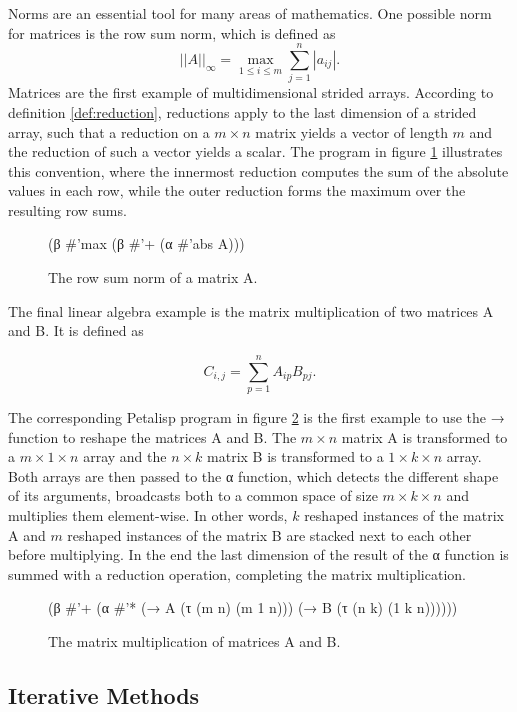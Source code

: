 Norms are an essential tool for many areas of mathematics. One possible
norm for matrices is the row sum norm, which is defined as
$$ ||A||_\infty = \max_{1 \le i \le m} \sum_{j=1}^n |a_{ij}|.$$
Matrices are the first example of multidimensional strided
arrays. According to definition \ref{def:reduction}, reductions apply to
the last dimension of a strided array, such that a reduction on a
$m \times n$ matrix yields a vector of length $m$ and the reduction of such
a vector yields a scalar.  The program in figure \ref{fig:rowsumnorm}
illustrates this convention, where the innermost reduction computes the sum
of the absolute values in each row, while the outer reduction forms the
maximum over the resulting row sums.

\begin{figure}[h]
\resetlinenumber
\begin{code}
(β #'max (β #'+ (α #'abs A)))
\end{code}
\caption{The row sum norm of a matrix A.}
\label{fig:rowsumnorm}
\end{figure}

The final linear algebra example is the matrix multiplication of two
matrices A and B. It is defined as

$$C_{i,j} = \sum_{p=1}^{n} A_{ip} B_{pj}.$$

The corresponding Petalisp program in figure \ref{fig:matmul} is the first
example to use the → function to reshape the matrices A and B. The
$m \times n$ matrix A is transformed to a $m \times 1 \times n$ array and
the $n \times k$ matrix B is transformed to a $1 \times k \times n$
array. Both arrays are then passed to the α function, which detects the
different shape of its arguments, broadcasts both to a common space of size
$m \times k \times n$ and multiplies them element-wise. In other words, $k$
reshaped instances of the matrix A and $m$ reshaped instances of the matrix
B are stacked next to each other before multiplying. In the end the last
dimension of the result of the α function is summed with a reduction
operation, completing the matrix multiplication.

\begin{figure}[h]
\resetlinenumber
\begin{code}
(β #'+
   (α #'*
      (→ A (τ (m n) (m 1 n)))
      (→ B (τ (n k) (1 k n))))))
\end{code}
\caption{The matrix multiplication of matrices A and B.}
\label{fig:matmul}
\end{figure}

\subsection{Iterative Methods}